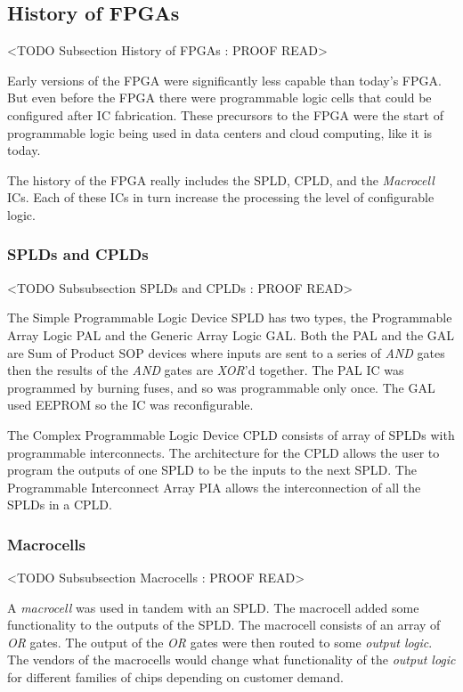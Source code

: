 \subsection{History of FPGAs}
	<TODO Subsection History of FPGAs : PROOF READ>

Early versions of the \ac{FPGA} were significantly less capable than today's \ac{FPGA}. But even before the \ac{FPGA} there were programmable logic cells that could be configured after \ac{IC} fabrication. These precursors to the \ac{FPGA} were the start of programmable logic being used in data centers and cloud computing, like it is today.

The history of the \ac{FPGA} really includes the \ac{SPLD}, \ac{CPLD}, and the \emph{Macrocell} \ac{IC}s. Each of these \ac{IC}s in turn increase the processing the level of configurable logic.
	
\subsubsection{SPLDs and CPLDs}
	<TODO Subsubsection  SPLDs and CPLDs : PROOF READ>

The Simple Programmable Logic Device \ac{SPLD} has two types, the Programmable Array Logic \ac{PAL} and the Generic Array Logic \ac{GAL}. Both the \ac{PAL} and the \ac{GAL} are Sum of Product \ac{SOP} devices where inputs are sent to a series of \emph{AND} gates then the results of the \emph{AND} gates are \emph{XOR}'d together. The \ac{PAL} \ac{IC} was programmed by burning fuses, and so was programmable only once. The \ac{GAL} used \ac{EEPROM} so the \ac{IC} was reconfigurable.

The Complex Programmable Logic Device \ac{CPLD} consists of array of \ac{SPLD}s with programmable interconnects. The architecture for the \ac{CPLD} allows the user to program the outputs of one \ac{SPLD} to be the inputs to the next \ac{SPLD}. The Programmable Interconnect Array \ac{PIA} allows the interconnection of all the \ac{SPLD}s in a \ac{CPLD}.
	
\subsubsection{Macrocells}
	<TODO Subsubsection  Macrocells : PROOF READ>

A \emph{macrocell} was used in tandem with an \ac{SPLD}. The macrocell added some functionality to the outputs of the \ac{SPLD}. The macrocell consists of an array of \emph{OR} gates. The output of the \emph{OR} gates were then routed to some \emph{output logic}. The vendors of the macrocells would change what functionality of the \emph{output logic} for different families of chips depending on customer demand.
	
